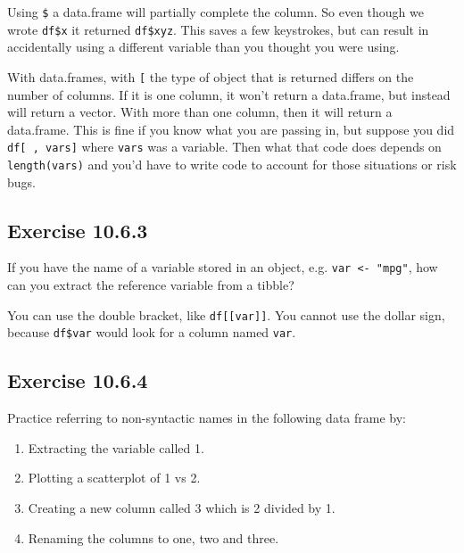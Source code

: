 \documentclass[]{book}
\providecommand{\tightlist}{%
  \setlength{\itemsep}{0pt}\setlength{\parskip}{0pt}}
\theoremstyle{plain}
\theoremstyle{remark}
\begin{document}
Using \texttt{\$} a data.frame will partially complete the column. So even though we
wrote \texttt{df\$x} it returned \texttt{df\$xyz}. This saves a few keystrokes, but can result
in accidentally using a different variable than you thought you were using.

With data.frames, with \texttt{{[}} the type of object that is returned differs on the
number of columns. If it is one column, it won't return a data.frame, but
instead will return a vector. With more than one column, then it will return a
data.frame. This is fine if you know what you are passing in, but suppose you
did \texttt{df{[}\ ,\ vars{]}} where \texttt{vars} was a variable. Then what that code does
depends on \texttt{length(vars)} and you'd have to write code to account for those
situations or risk bugs.

\hypertarget{exercise-10.6.3}{%
\subsection*{\texorpdfstring{Exercise {10.6.3}}{Exercise 10.6.3}}\label{exercise-10.6.3}}

If you have the name of a variable stored in an object, e.g. \texttt{var\ \textless{}-\ "mpg"}, how can you extract the reference variable from a tibble?

You can use the double bracket, like \texttt{df{[}{[}var{]}{]}}. You cannot use the dollar sign, because \texttt{df\$var} would look for a column named \texttt{var}.

\hypertarget{exercise-10.6.4}{%
\subsection*{\texorpdfstring{Exercise {10.6.4}}{Exercise 10.6.4}}\label{exercise-10.6.4}}

Practice referring to non-syntactic names in the following data frame by:

\begin{enumerate}
\def\labelenumi{\arabic{enumi}.}
\tightlist
\item
  Extracting the variable called 1.
\item
  Plotting a scatterplot of 1 vs 2.
\item
  Creating a new column called 3 which is 2 divided by 1.
\item
  Renaming the columns to one, two and three.
\end{enumerate}
\end{document}
